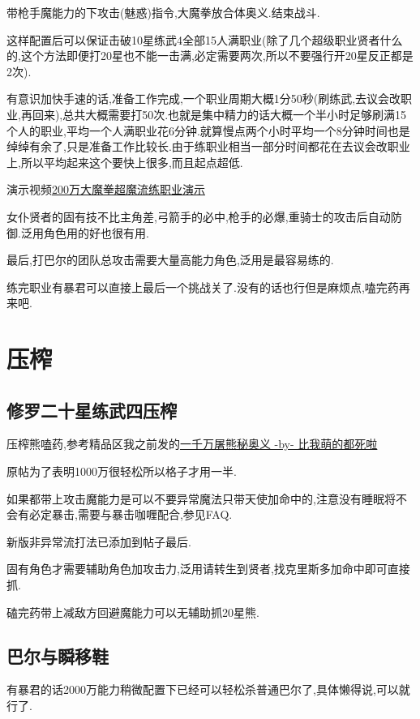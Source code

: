 		带枪手魔能力的下攻击(魅惑)指令,大魔拳放合体奥义.结束战斗.

		这样配置后可以保证击破10星练武4全部15人满职业(除了几个超级职业贤者什么的,这个方法即便打20星也不能一击满,必定需要两次,所以不要强行开20星反正都是2次).

		有意识加快手速的话,准备工作完成,一个职业周期大概1分50秒(刷练武,去议会改职业,再回来),总共大概需要打50次.也就是集中精力的话大概一个半小时足够刷满15个人的职业,平均一个人满职业花6分钟.就算慢点两个小时平均一个8分钟时间也是绰绰有余了,只是准备工作比较长.由于练职业相当一部分时间都花在去议会改职业上,所以平均起来这个要快上很多,而且起点超低.

		演示视频\href{http://www.bilibili.com/video/av2966618/}{200万大魔拳超魔流练职业演示}

		女仆贤者的固有技不比主角差,弓箭手的必中,枪手的必爆,重骑士的攻击后自动防御.泛用角色用的好也很有用.

		最后,打巴尔的团队总攻击需要大量高能力角色,泛用是最容易练的.

		练完职业有暴君可以直接上最后一个挑战关了.没有的话也行但是麻烦点,嗑完药再来吧.

	\newpage

	\section{压榨}

		\subsection{修罗二十星练武四压榨}

		压榨熊嗑药,参考精品区我之前发的\href{http://tieba.baidu.com/p/3825275063}{一千万屠熊秘奥义 -by- 比我萌的都死啦}

		原帖为了表明1000万很轻松所以格子才用一半.

		如果都带上攻击魔能力是可以不要异常魔法只带天使加命中的,注意没有睡眠将不会有必定暴击,需要与暴击咖喱配合,参见FAQ.

		新版非异常流打法已添加到帖子最后.

		固有角色才需要辅助角色加攻击力,泛用请转生到贤者,找克里斯多加命中即可直接抓.

		磕完药带上减敌方回避魔能力可以无辅助抓20星熊.

		\subsection{巴尔与瞬移鞋}

		有暴君的话2000万能力稍微配置下已经可以轻松杀普通巴尔了,具体懒得说,可以就行了.

